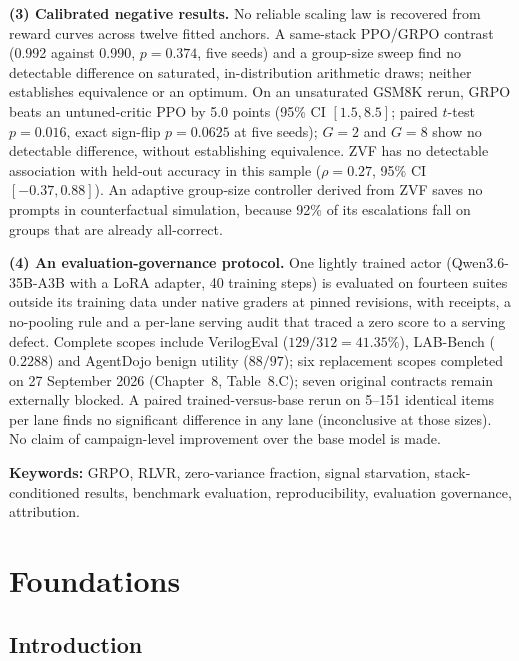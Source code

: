 \documentclass[12pt,a4paper]{report}
\begin{document}
\textbf{(3) Calibrated negative results.} No reliable scaling law is recovered
from reward curves across twelve fitted anchors. A same-stack PPO/GRPO
contrast (0.992 against 0.990, $p = 0.374$, five seeds) and a group-size sweep
find no detectable difference on saturated, in-distribution arithmetic draws;
neither establishes equivalence or an optimum. On an unsaturated GSM8K rerun, GRPO beats an
untuned-critic PPO by 5.0 points (95\% CI $[1.5, 8.5]$; paired $t$-test
$p=0.016$, exact sign-flip $p=0.0625$ at five seeds); $G = 2$ and $G = 8$
show no detectable difference, without establishing equivalence. ZVF has no
detectable association with held-out accuracy in this sample
($\rho = 0.27$, 95\% CI $[-0.37, 0.88]$). An adaptive group-size controller
derived from ZVF saves no prompts in counterfactual simulation, because 92\% of its escalations fall on
groups that are already all-correct.

\textbf{(4) An evaluation-governance protocol.} One lightly trained actor
(Qwen3.6-35B-A3B with a LoRA adapter, 40 training steps) is evaluated on
fourteen suites outside its training data under native graders at pinned revisions, with
receipts, a no-pooling rule and a per-lane serving audit that traced a
zero score to a serving defect. Complete scopes include VerilogEval
($129/312 = 41.35\%$), LAB-Bench ($0.2288$) and AgentDojo benign utility
($88/97$); six replacement scopes completed on 27 September 2026
(Chapter~8, Table~8.C); seven original contracts remain externally blocked. A
paired trained-versus-base rerun on 5--151 identical items per lane finds no
significant difference in any lane (inconclusive at those sizes). No
claim of campaign-level improvement over the base model is made.

\vspace{0.25in}
\noindent\textbf{Keywords:} GRPO, RLVR, zero-variance fraction, signal
starvation, stack-conditioned results, benchmark evaluation, reproducibility,
evaluation governance, attribution.

\tableofcontents
\listoffigures
\listoftables


\cleardoublepage
{}
\hypersetup{pageanchor=true}


\part{Foundations}


\chapter{Introduction}\label{introduction}
\end{document}
